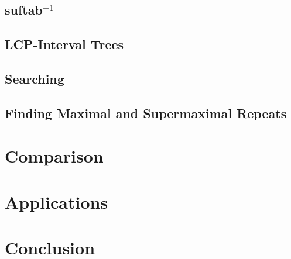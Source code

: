 \documentclass{article}
\begin{document}
\subsection*{suftab$^{-1}$}


\subsection*{LCP-Interval Trees}

\subsection*{Searching}

\subsection*{Finding Maximal and Supermaximal Repeats}

\section*{Comparison}

\section*{Applications}

\section*{Conclusion}
\end{document}
